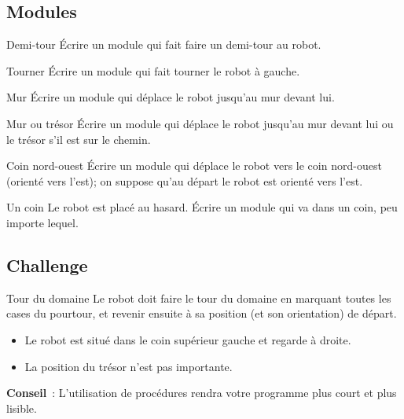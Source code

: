 	\subsection{Modules}

		\begin{Exercice}{Demi-tour}
			Écrire un module qui fait faire un demi-tour au robot.
		\end{Exercice}

		\begin{Exercice}{Tourner}
			Écrire un module qui fait tourner le robot à gauche.
		\end{Exercice}

		\begin{Exercice}{Mur}
			Écrire un module qui déplace le robot
			jusqu'au mur devant lui.
		\end{Exercice}

		\begin{Exercice}{Mur ou trésor}
			Écrire un module qui déplace le robot jusqu'au mur
			devant lui ou le trésor s'il est sur le chemin.
		\end{Exercice}

		\begin{Exercice}{Coin nord-ouest}
			Écrire un module qui déplace le robot vers le coin nord-ouest 
			(orienté vers l'est); on suppose qu'au départ
			le robot est orienté vers l'est.
		\end{Exercice}

		\begin{Exercice}{Un coin}
			Le robot est placé au hasard. 
			Écrire un module qui va dans un coin, peu
			importe lequel. 
		\end{Exercice}

	\subsection{Challenge}

		\begin{Exercice}{Tour du domaine}
			Le robot doit faire le tour du domaine en marquant toutes les cases du
			pourtour, et revenir ensuite à sa position (et son orientation) de
			départ.

			\begin{itemize}
			\item Le robot est situé dans le coin supérieur gauche et regarde à droite.
			\item La position du trésor n'est pas importante.
			\end{itemize}

			\textbf{Conseil}~: L'utilisation de procédures rendra
			votre programme plus court et plus lisible.
		\end{Exercice}

